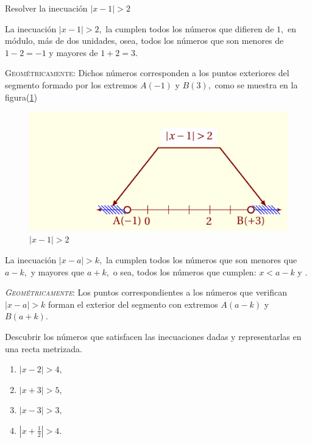 \documentclass[oneside,english,spanish,2m,twoside,svgnames,x11names,HTML,twoside,12pt]{libro-matua}\usepackage[]{graphicx}\usepackage[]{color}
\newcommand{\noun}[1]{\textsc{#1}}
\newcommand{\val}[1]{\left|#1\right|}
\begin{document}
\begin{ejemplo}

Resolver la inecuación $\val{x-1}>2$

\end{ejemplo}

\sol La inecuación $\val{x-1}>2,$ la cumplen todos los números que
difieren de $1,$ en módulo, más de dos unidades, osea, todos los
números que son menores de $1-2=-1$ y mayores de $1+2=3.$

\noun{Geométricamente}: Dichos números corresponden a los puntos exteriores
del segmento formado por los extremos $A\left(-1\right)$ y $B\left(3\right),$
como se muestra en la figura(\ref{fig:cal_lim6})
\begin{figure}[H]
\centering\includegraphics{8_home_antalcides_MEGA_calculo_I_libro_pdf_cal_lim6.pdf}\caption{$\val{x-1}>2$}\label{fig:cal_lim6}
\end{figure}
\fin

\general La inecuación $\val{x-a}>k,$ la cumplen todos los números
que son menores que $a-k,$ y mayores que $a+k,$ o sea, todos los
números que cumplen: $x<a-k$ y .

\emph{\noun{Geométricamente}}: Los puntos correspondientes a los números
que verifican $\val{x-a}>k$ forman el exterior del segmento con extremos
$A\left(a-k\right)$ y $B\left(a+k\right).$

\begin{ejercicios}[]

Descubrir los números que satisfacen las inecuaciones dadas y representarlas
en una recta metrizada.
\begin{enumerate}
\item $\val{x-2}>4,$ 
\item $\val{x+3}>5,$
\item $\val{x-3}>3,$
\item $\val{x+\frac{1}{2}}>4.$ 
\end{enumerate}
\end{ejercicios}
\end{document}
